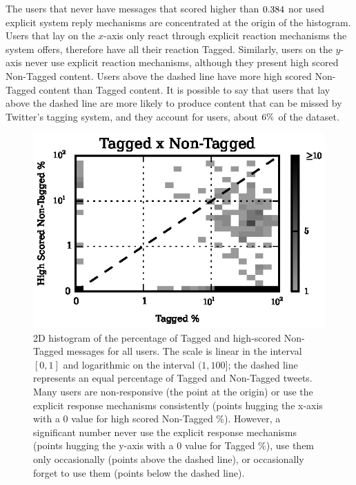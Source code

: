 The \usersScoreZero{} users that never have messages that scored higher than $0.384{}$ nor used explicit system reply mechanisms are concentrated at the origin of the histogram.
Users that lay on the $x$-axis only react through explicit reaction mechanisms the system offers, therefore have all their reaction Tagged. Similarly, users on the $y$-axis never use explicit reaction mechanisms, although they present high scored Non-Tagged content. Users above the dashed line have more high scored Non-Tagged content than Tagged content. It is possible to say that users that lay above the dashed line are more likely to produce content that can be missed by Twitter's tagging system, and they account for \usersAboveLine{} users, about $6{}\%$ of the dataset. 

\begin{figure}[!tb]
\centering
\includegraphics[scale=1.2]{./figures/user_alltagged_highnontagged_2dhist_0375.eps}
\caption{2D histogram of the percentage of Tagged and high-scored Non-Tagged messages for all users. The scale is linear in the interval $[0,1]$ and logarithmic on the interval $(1,100]$; the dashed line represents an equal percentage of Tagged and Non-Tagged tweets. 
Many users are non-responsive (the point at the origin) or use the explicit response mechanisms consistently (points hugging the x-axis with a 0 value for high scored Non-Tagged \%).  However, a significant number never use the explicit response mechanisms (points hugging the y-axis with a 0 value for Tagged \%), use them only occasionally (points above the dashed line), or occasionally forget to use them (points below the dashed line).}
\label{fig:2d_histogram}
\end{figure}


